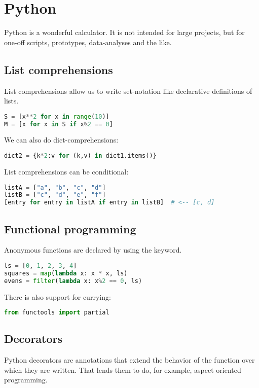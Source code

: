 \section{Python}

Python is a wonderful calculator. It is not intended for large projects, but for one-off scripts, prototypes, data-analyses and the like. 

\subsection{List comprehensions}

List comprehensions allow us to write set-notation like declarative definitions of lists.

\begin{lstlisting}[language=python]
S = [x**2 for x in range(10)]
M = [x for x in S if x%2 == 0]
\end{lstlisting}

We can also do dict-comprehensions: 
\begin{lstlisting}[language=python]
dict2 = {k*2:v for (k,v) in dict1.items()}
\end{lstlisting}

List comprehensions can be conditional: 
\begin{lstlisting}[language=python]
listA = ["a", "b", "c", "d"]
listB = ["c", "d", "e", "f"] 
[entry for entry in listA if entry in listB]  # <-- [c, d]
\end{lstlisting} 

\subsection{Functional programming}

Anonymous functions are declared by using the  keyword. 
\begin{lstlisting}[language=python]
ls = [0, 1, 2, 3, 4]
squares = map(lambda x: x * x, ls)
evens = filter(lambda x: x%2 == 0, ls)
\end{lstlisting}

There is also support for currying: 
\begin{lstlisting}[language=python]
from functools import partial
\end{lstlisting}

\subsection{Decorators}
Python decorators are annotations that extend the behavior of the function over which they are written. That lends them to do, for example, aspect oriented programming.

